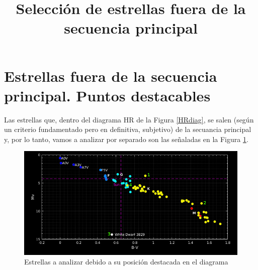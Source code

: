 \documentclass[a4paper]{article}
\begin{document}
\section{Estrellas fuera de la secuencia principal. Puntos destacables}
Las estrellas que, dentro del diagrama HR de la Figura \ref{HRdiag}, se salen (seg\'{u}n un criterio fundamentado pero en definitiva, subjetivo) de la secuancia principal y, por lo tanto, vamos a analizar por separado son las se\~{n}aladas en la Figura \ref{HRNum}.
	\begin{figure}[!htbp]
	\title{\textbf{Selecci\'{o}n de estrellas fuera de la secuencia principal} \vspace{3ex}}
		\centering
		\begin{center}
			\includegraphics[trim={0 0.4cm 0 0},clip, width=15cm]{Figures/HRNumbers.png}
		\end{center}
		\caption{\footnotesize{Estrellas a analizar debido a su posici\'{o}n destacada en el diagrama}}
		\label{HRNum}
		\end{figure}
		
		
		
\end{document}
